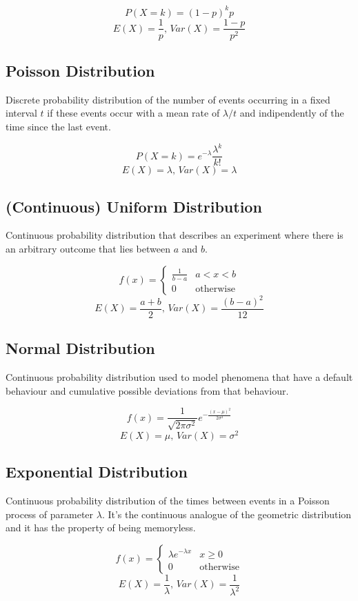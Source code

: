 \[P(X = k) = (1 - p)^kp\]
\[E(X) = \frac{1}{p},\,Var(X) = \frac{1 - p}{p^2}\]


\subsection{Poisson Distribution}
Discrete probability distribution of the number of events occurring
in a fixed interval $t$ if these events occur with a mean rate of $\lambda / t$
and indipendently of the time since the last event.

\[P(X = k) = e^{-\lambda}\frac{\lambda^k}{k!}\]
\[E(X) = \lambda,\,Var(X) = \lambda\]


\subsection{(Continuous) Uniform Distribution}
Continuous probability distribution that describes an experiment
where there is an arbitrary outcome that lies between $a$ and $b$.

\[f(x) =
	\begin{cases}
		\frac{1}{b-a} & a < x < b \\
		0 & \textrm{otherwise}
	\end{cases}
\]
\[E(X) = \frac{a + b}{2},\,Var(X) = \frac{(b - a)^2}{12}\]


\subsection{Normal Distribution}
Continuous probability distribution used to model phenomena that have
a default behaviour and cumulative possible deviations from that behaviour.

\[f(x) = \frac{1}{\sqrt{2\pi\sigma^2}}e^{-\frac{(x - \mu)^2}{2\sigma^2}}\]
\[E(X) = \mu,\,Var(X) = \sigma^2\]


\subsection{Exponential Distribution}
Continuous probability distribution of the times between events
in a Poisson process of parameter $\lambda$.
It's the continuous analogue of the geometric distribution and
it has the property of being memoryless.

\[f(x) =
	\begin{cases}
		\lambda e^{-\lambda x} & x \ge 0 \\
		0 & \textrm{otherwise}
	\end{cases}
\]
\[E(X) = \frac{1}{\lambda},\,Var(X) = \frac{1}{\lambda^2}\]
